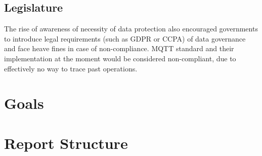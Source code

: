 \subsection{Legislature}
The rise of awareness of necessity of data protection also encouraged governments to introduce legal requirements (such as GDPR or CCPA) of data governance and face heave fines in case of non-compliance. MQTT standard and their implementation at the moment would be considered non-compliant, due to effectively no way to trace past operations. 


\section{Goals}

\section{Report Structure}


